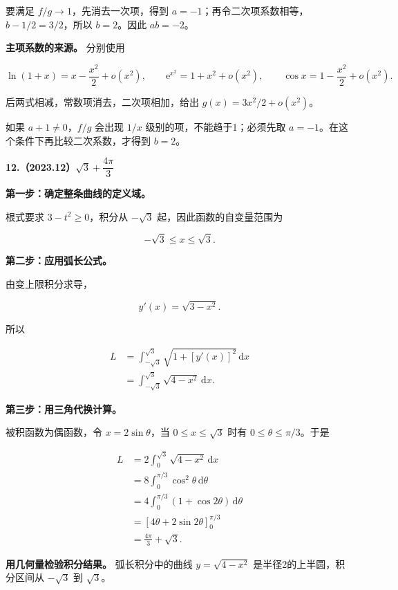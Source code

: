 \documentclass[UTF8,11pt,fontset=windows]{ctexart}
\begin{document}
要满足 $f/g\to1$，先消去一次项，得到 $a=-1$；再令二次项系数相等，$b-1/2=3/2$，所以 $b=2$。因此 $ab=-2$。

\textbf{主项系数的来源。} 分别使用

$$
\ln(1+x)=x-\frac{x^2}{2}+o(x^2),
\qquad\mathrm e^{x^2}=1+x^2+o(x^2),
\qquad\cos x=1-\frac{x^2}{2}+o(x^2).
$$

后两式相减，常数项消去，二次项相加，给出 $g(x)=3x^2/2+o(x^2)$。

如果 $a+1\ne0$，$f/g$ 会出现 $1/x$ 级别的项，不能趋于1；必须先取 $a=-1$。在这个条件下再比较二次系数，才得到 $b=2$。

\clearpage

\textbf{12.（2023.12）$\sqrt3+\dfrac{4\pi}{3}$}

\textbf{第一步：确定整条曲线的定义域。}

根式要求 $3-t^2\ge0$，积分从 $-\sqrt3$ 起，因此函数的自变量范围为

$$
-\sqrt3\le x\le\sqrt3.
$$

\textbf{第二步：应用弧长公式。}

由变上限积分求导，

$$
y'(x)=\sqrt{3-x^2}.
$$

所以

$$
\begin{aligned}
L&=\int_{-\sqrt3}^{\sqrt3}\sqrt{1+[y'(x)]^2}\,\mathrm dx\\
&=\int_{-\sqrt3}^{\sqrt3}\sqrt{4-x^2}\,\mathrm dx.
\end{aligned}
$$

\textbf{第三步：用三角代换计算。}

被积函数为偶函数，令 $x=2\sin\theta$，当 $0\le x\le\sqrt3$ 时有 $0\le\theta\le\pi/3$。于是

$$
\begin{aligned}
L&=2\int_0^{\sqrt3}\sqrt{4-x^2}\,\mathrm dx\\
&=8\int_0^{\pi/3}\cos^2\theta\,\mathrm d\theta\\
&=4\int_0^{\pi/3}(1+\cos2\theta)\,\mathrm d\theta\\
&=\left[4\theta+2\sin2\theta\right]_0^{\pi/3}\\
&=\frac{4\pi}{3}+\sqrt3.
\end{aligned}
$$

\textbf{用几何量检验积分结果。} 弧长积分中的曲线 $y=\sqrt{4-x^2}$ 是半径2的上半圆，积分区间从 $-\sqrt3$ 到 $\sqrt3$。
\end{document}
